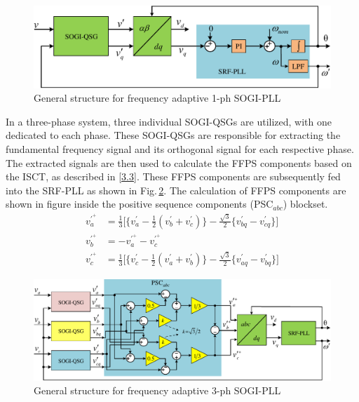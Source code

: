 \begin{figure}[]   
	\centering
	\includegraphics[scale=0.7]{figures/Chapter_3/Mine/SOGI-PLL.pdf}
	\caption{General structure for frequency adaptive 1-ph SOGI-PLL}
	\label{fig3.2}
\end{figure} \vspace*{-0.5cm}
In a three-phase system, three individual SOGI-QSGs are utilized, with one dedicated to each phase. These SOGI-QSGs are responsible for extracting the fundamental frequency signal and its orthogonal signal for each respective phase. The extracted signals are then used to calculate the FFPS components based on the ISCT, as described in \eqref{3.3}. These FFPS components are subsequently fed into the SRF-PLL as shown in Fig.\,\ref{fig3.3}. The calculation of FFPS components are shown in figure inside the positive sequence components (PSC$_{abc}$) blockset.
\begin{equation} \label{3.3}
		\begin{aligned}
			v^{\prime^{+}}_{a} &= \frac{1}{3} \bigg[ \Big\{ v^{\prime}_{a} - \frac{1}{2} ( v^{\prime}_{b} + v^{\prime}_{c} )   \Big\}  - \frac{\sqrt{3}}{2} \Big\{ v^{\prime}_{bq} -v^{\prime}_{cq}  \Big\} \bigg] \\
			v^{\prime^{+}}_{b} &= - v^{\prime^{+}}_{a} - v^{\prime^{+}}_{c} \\
			v^{\prime^{+}}_{c} &= \frac{1}{3} \bigg[ \Big\{ v^{\prime}_{c} - \frac{1}{2} ( v^{\prime}_{a} + v^{\prime}_{b} )   \Big\}  - \frac{\sqrt{3}}{2} \Big\{ v^{\prime}_{aq} -v^{\prime}_{bq}  \Big\} \bigg] 
		\end{aligned}
\end{equation}
\begin{figure}[]   
	\centering
	\includegraphics[scale=0.65]{figures/Chapter_3/Mine/SOGI-PLL-3ph.pdf}
	\caption{General structure for frequency adaptive 3-ph SOGI-PLL}
	\label{fig3.3}
\end{figure}
